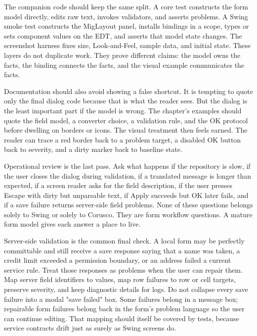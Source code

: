 The companion code should keep the same split. A core test constructs the form
model directly, edits raw text, invokes validators, and asserts problems. A
Swing smoke test constructs the MigLayout panel, installs bindings in a scope,
types or sets component values on the EDT, and asserts that model state changes.
The screenshot harness fixes size, Look-and-Feel, sample data, and initial
state. These layers do not duplicate work. They prove different claims: the
model owns the facts, the binding connects the facts, and the visual example
communicates the facts.

Documentation should also avoid showing a false shortcut. It is tempting to
quote only the final dialog code because that is what the reader sees. But the
dialog is the least important part if the model is wrong. The chapter's
examples should quote the field model, a converter choice, a validation rule,
and the OK protocol before dwelling on borders or icons. The visual treatment
then feels earned. The reader can trace a red border back to a problem target,
a disabled OK button back to severity, and a dirty marker back to baseline
state.

Operational review is the last pass. Ask what happens if the repository is
slow, if the user closes the dialog during validation, if a translated message
is longer than expected, if a screen reader asks for the field description, if
the user presses Escape with dirty but unparsable text, if Apply succeeds but
OK later fails, and if a save failure returns server-side field problems. None
of these questions belongs solely to Swing or solely to Corusco. They are form
workflow questions. A mature form model gives each answer a place to live.

Server-side validation is the common final check. A local form may be perfectly
committable and still receive a save response saying that a name was taken, a
credit limit exceeded a permission boundary, or an address failed a current
service rule. Treat those responses as problems when the user can repair them.
Map server field identifiers to  values, map row failures to row
or cell targets, preserve severity, and keep diagnostic details for logs. Do
not collapse every save failure into a modal "save failed" box. Some failures
belong in a message box; repairable form failures belong back in the form's
problem language so the user can continue editing. That mapping should itself
be covered by tests, because service contracts drift just as surely as Swing
screens do.

